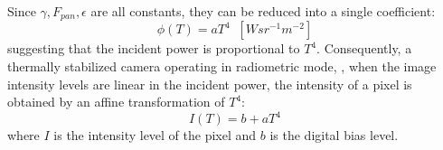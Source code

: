 Since $\gamma, F_\mathit{pan}, \epsilon$ are all constants, they can be reduced into a single coefficient:
\begin{equation} \label{BolometerIncidentPowerSimplified}
  \phi(T) = a T^4 \; \; \left[W sr^{-1} m^{-2}\right]
\end{equation}
suggesting that the incident power is proportional to $T^4$.
Consequently, a thermally stabilized camera operating in radiometric mode, \ie, when the image intensity levels are linear in the incident power, the intensity of a pixel is obtained by an affine transformation of $T^4$:
\begin{equation} \label{eq:naiveAffineTrans}
  I(T) = b + a T^4
\end{equation}
where $I$ is the intensity level of the pixel and $b$ is the digital bias level. 
